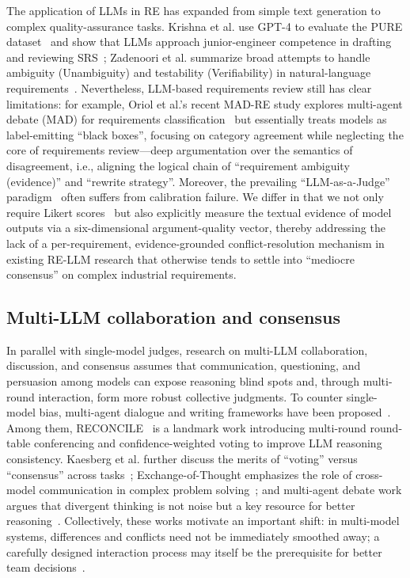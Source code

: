 \documentclass[sn-mathphys-num]{sn-jnl}
\begin{document}
The application of LLMs in RE has expanded from simple text generation to complex quality-assurance tasks. Krishna et al. use GPT-4 to evaluate the PURE dataset~\cite{ref9} and show that LLMs approach junior-engineer competence in drafting and reviewing SRS~\cite{ref10}; Zadenoori et al. summarize broad attempts to handle ambiguity (Unambiguity) and testability (Verifiability) in natural-language requirements~\cite{ref11}. Nevertheless, LLM-based requirements review still has clear limitations: for example, Oriol et al.'s recent MAD-RE study explores multi-agent debate (MAD) for requirements classification~\cite{ref12} but essentially treats models as label-emitting ``black boxes'', focusing on category agreement while neglecting the core of requirements review---deep argumentation over the semantics of disagreement, i.e., aligning the logical chain of ``requirement ambiguity (evidence)'' and ``rewrite strategy''. Moreover, the prevailing ``LLM-as-a-Judge'' paradigm~\cite{ref13,ref14} often suffers from calibration failure. We differ in that we not only require Likert scores~\cite{ref10} but also explicitly measure the textual evidence of model outputs via a six-dimensional argument-quality vector, thereby addressing the lack of a per-requirement, evidence-grounded conflict-resolution mechanism in existing RE-LLM research that otherwise tends to settle into ``mediocre consensus'' on complex industrial requirements.

\subsection{Multi-LLM collaboration and consensus}
In parallel with single-model judges, research on multi-LLM collaboration, discussion, and consensus assumes that communication, questioning, and persuasion among models can expose reasoning blind spots and, through multi-round interaction, form more robust collective judgments. To counter single-model bias, multi-agent dialogue and writing frameworks have been proposed~\cite{ref15,ref16,ref17}. Among them, RECONCILE~\cite{ref18} is a landmark work introducing multi-round round-table conferencing and confidence-weighted voting to improve LLM reasoning consistency. Kaesberg et al. further discuss the merits of ``voting'' versus ``consensus'' across tasks~\cite{ref19}; Exchange-of-Thought emphasizes the role of cross-model communication in complex problem solving~\cite{ref20}; and multi-agent debate work argues that divergent thinking is not noise but a key resource for better reasoning~\cite{ref16}. Collectively, these works motivate an important shift: in multi-model systems, differences and conflicts need not be immediately smoothed away; a carefully designed interaction process may itself be the prerequisite for better team decisions~\cite{ref16,ref20}.
\end{document}
